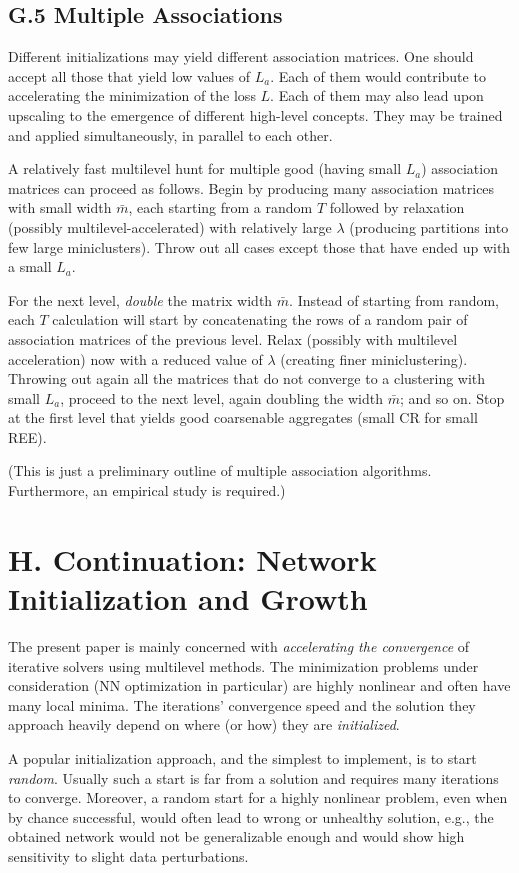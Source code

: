 \documentclass{article} %
\begin{document}
\subsection{G.5 Multiple Associations}
Different initializations may yield different association matrices. One should accept all those that yield low values of $L_a$. Each of them would contribute to accelerating the minimization of the loss $L$. Each of them may also lead upon upscaling to the emergence of different high-level concepts. They may be trained and applied simultaneously, in parallel to each other.

A relatively fast multilevel hunt for multiple good (having small $L_a$) association matrices can proceed as follows. Begin by producing many association matrices with small width $\bar{m}$, each starting from a random $T$ followed by relaxation (possibly multilevel-accelerated) with relatively large $\lambda$ (producing partitions into few large miniclusters). Throw out all cases except those that have ended up with a small $L_a$.

For the next level, {\it double} the matrix width $\bar{m}$. Instead of starting from random, each $T$ calculation will start by concatenating the rows of a random pair of association matrices of the previous level. Relax (possibly with multilevel acceleration) now with a reduced value of $\lambda$ (creating finer miniclustering). Throwing out again all the matrices that do not converge to a clustering with small $L_a$, proceed to the next level, again doubling the width $\bar{m}$; and so on. Stop at the first level that yields good coarsenable aggregates (small CR for small REE).

(This is just a preliminary outline of multiple association algorithms. Furthermore, an empirical study is required.)

\section{H. Continuation: Network Initialization and Growth}
\label{sec:h}
The present paper is mainly concerned with {\it accelerating the convergence} of iterative solvers using multilevel methods. The minimization problems under consideration (NN optimization in particular) are highly nonlinear and often have many local minima. The iterations' convergence speed and the solution they approach heavily depend on where (or how) they are {\it initialized}.

A popular initialization approach, and the simplest to implement, is to start {\it random}. Usually such a start is far from a solution and requires many iterations to converge. Moreover, a random start for a highly nonlinear problem, even when by chance successful, would often lead to wrong or unhealthy solution, e.g., the obtained network would not be generalizable enough and would show high sensitivity to slight data perturbations.
\end{document}
